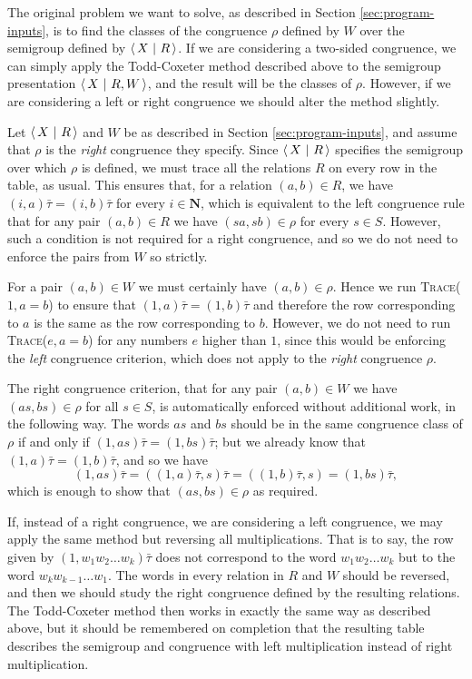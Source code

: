 The original problem we want to solve, as described in Section
\ref{sec:program-inputs}, is to find the classes of the congruence $\rho$
defined by $W$ over the semigroup defined by $\left\langle\,X ~\middle|~ R\,\right\rangle$.  If we are considering
a two-sided congruence, we can simply apply the Todd-Coxeter method described
above to the semigroup presentation $\left\langle\,X ~\middle|~ R,W\,\right\rangle$, and the result will be the
classes of $\rho$.  However, if we are considering a left or right congruence we
should alter the method slightly.

Let $\left\langle\,X ~\middle|~ R\,\right\rangle$ and $W$ be as described in Section \ref{sec:program-inputs}, and
assume that $\rho$ is the \textit{right} congruence they specify.  Since
$\left\langle\,X ~\middle|~ R\,\right\rangle$ specifies the semigroup over which $\rho$ is defined, we must trace
all the relations $R$ on every row in the table, as usual.  This ensures that,
for a relation $(a,b) \in R$, we have $(i, a)\bar\tau = (i, b)\bar\tau$ for
every $i \in \mathbf{N}$, which is equivalent to the left congruence rule that
for any pair $(a,b) \in R$ we have $(sa, sb) \in \rho$ for every $s \in S$.
However, such a condition is not required for a right congruence, and so we do
not need to enforce the pairs from $W$ so strictly.

For a pair $(a,b) \in W$ we must certainly have $(a,b) \in \rho$.  Hence we run
\textsc{Trace($1, a=b$)} to ensure that $(1,a)\bar\tau = (1,b)\bar\tau$ and
therefore the row corresponding to $a$ is the same as the row corresponding to
$b$.  However, we do not need to run \textsc{Trace($e, a=b$)} for any numbers
$e$ higher than $1$, since this would be enforcing the \textit{left} congruence
criterion, which does not apply to the \textit{right} congruence $\rho$.

The right congruence criterion, that for any pair $(a,b) \in W$ we have
$(as, bs) \in \rho$ for all $s \in S$, is automatically enforced without
additional work, in the following way.  The words $as$ and $bs$ should be in the
same congruence class of $\rho$ if and only if
$(1, as)\bar\tau = (1, bs)\bar\tau$; but we already know that
$(1, a)\bar\tau = (1, b)\bar\tau$, and so we have
$$(1, as)\bar\tau
= ((1, a)\bar\tau, s)\bar\tau
= ((1, b)\bar\tau, s)
= (1, bs)\bar\tau,$$
which is enough to show that $(as, bs) \in \rho$ as required.

If, instead of a right congruence, we are considering a left congruence, we may
apply the same method but reversing all multiplications.  That is to say, the
row given by $(1, w_1 w_2 \ldots w_k)\bar\tau$ does not correspond to the word
$w_1 w_2 \ldots w_k$ but to the word $w_k w_{k-1} \ldots w_1$.  The words in
every relation in $R$ and $W$ should be reversed, and then we should study the
right congruence defined by the resulting relations.  The Todd-Coxeter method
then works in exactly the same way as described above, but it should be
remembered on completion that the resulting table describes the semigroup and
congruence with left multiplication instead of right multiplication.

